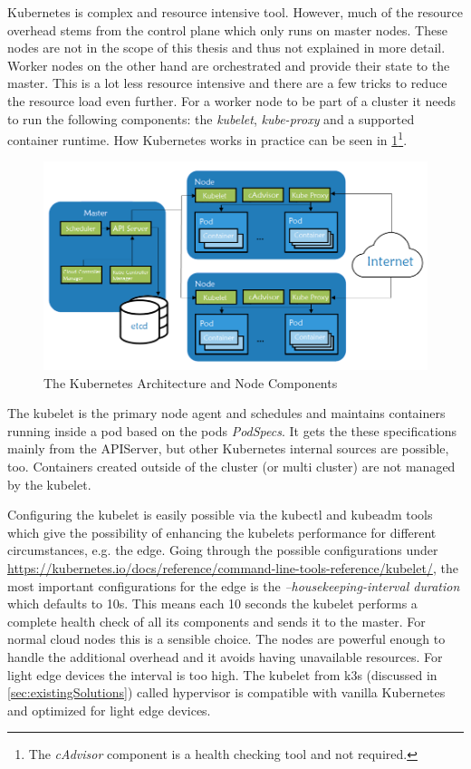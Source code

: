 Kubernetes is complex and resource intensive tool. However, much of the resource overhead stems from the control plane which only runs on master nodes. These nodes are not in the scope of this thesis and thus not explained in more detail. Worker nodes on the other hand are orchestrated and provide their state to the master. This is a lot less resource intensive and there are a few tricks to reduce the resource load even further. For a worker node to be part of a cluster it needs to run the following components: the \textit{kubelet}, \textit{kube-proxy} and a supported container runtime. How Kubernetes works in practice can be seen in \cref{fig:nodeComponents}\footnote{The \textit{cAdvisor} component is a health checking tool and not required.}.
\begin{figure}[h!]
    \centering
    \includegraphics[scale=0.6]{figures/rancherK8sComponents.png}
    \caption{The Kubernetes Architecture and Node Components\cite{nodeSetupKubernetes:online}}
    \label{fig:nodeComponents}
\end{figure}
The kubelet is the primary node agent and schedules and maintains containers running inside a pod based on the pods \textit{PodSpecs}. It gets the these specifications mainly from the APIServer, but other Kubernetes internal sources are possible, too. Containers created outside of the cluster (or multi cluster) are not managed by the kubelet. 

Configuring the kubelet is easily possible via the kubectl and kubeadm tools which give the possibility of enhancing the kubelets performance for different circumstances, e.g. the edge. Going through the possible configurations under \url{https://kubernetes.io/docs/reference/command-line-tools-reference/kubelet/}, the most important configurations for the edge is the \textit{--housekeeping-interval duration} which defaults to 10s\cite{rancherKubernetesComponents:online}. This means each 10 seconds the kubelet performs a complete health check of all its components and sends it to the master. For normal cloud nodes this is a sensible choice. The nodes are powerful enough to handle the additional overhead and it avoids having unavailable resources. For light edge devices the interval is too high. The kubelet from k3s (discussed in \cref{sec:existingSolutions}) called hypervisor is compatible with vanilla Kubernetes and optimized for light edge devices.

